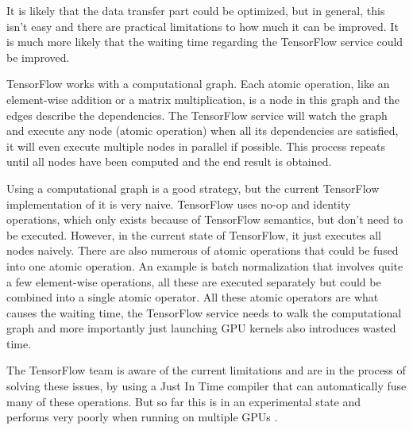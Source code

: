 It is likely that the data transfer part could be optimized, but in general, this isn't easy and there are practical limitations to how much it can be improved. It is much more likely that the waiting time regarding the TensorFlow service could be improved.

TensorFlow works with a computational graph. Each atomic operation, like an element-wise addition or a matrix multiplication, is a node in this graph and the edges describe the dependencies. The TensorFlow service will watch the graph and execute any node (atomic operation) when all its dependencies are satisfied, it will even execute multiple nodes in parallel if possible. This process repeats until all nodes have been computed and the end result is obtained.

Using a computational graph is a good strategy, but the current TensorFlow implementation of it is very naive. TensorFlow uses no-op and identity operations, which only exists because of TensorFlow semantics, but don't need to be executed. However, in the current state of TensorFlow, it just executes all nodes naively. There are also numerous of atomic operations that could be fused into one atomic operation. An example is batch normalization that involves quite a few element-wise operations, all these are executed separately but could be combined into a single atomic operator. All these atomic operators are what causes the waiting time, the TensorFlow service needs to walk the computational graph and more importantly just launching GPU kernels also introduces wasted time.

The TensorFlow team is aware of the current limitations and are in the process of solving these issues, by using a Just In Time compiler that can automatically fuse many of these operations. But so far this is in an experimental state and performs very poorly when running on multiple GPUs \cite{google-xla}.
